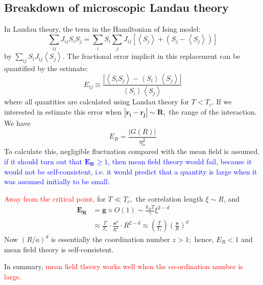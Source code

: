 \documentclass[12pt,titlepage]{article}
\newcommand{\redp}[1]{\textcolor{red}{#1}}
\newcommand{\bluep}[1]{\textcolor{blue}{#1}}
\numberwithin{equation}{section}
\begin{document}
\subsection{Breakdown of microscopic Landau theory}
In Landau theory, the term in the Hamiltonian of Ising model:
\begin{equation}
\sum_{i j} J_{i j} S_{i} S_{j}=\sum_{i} S_{i} \sum_{j} J_{i j}\left[\left\langle S_{j}\right\rangle+\left(S_{j}-\left\langle S_{j}\right\rangle\right)\right]
\end{equation}
by $\sum_{i j} S_{i} J_{i j}\left\langle S_{j}\right\rangle$. The fractional error implicit in this replacement can be quantified by the estimate:
\begin{equation}
E_{i j} \equiv \frac{\left|\left\langle S_{i} S_{j}\right\rangle-\left\langle S_{i}\right\rangle\left\langle S_{j}\right\rangle\right|}{\left\langle S_{i}\right\rangle\left\langle S_{j}\right\rangle}
\end{equation}
where all quantities are calculated using Landau theory for $T<T_{c}$. If we interested in estimate this error when $\left|\mathbf{r}_{\mathbf{i}}-\mathbf{r}_{\mathbf{j}}\right| \sim \boldsymbol{R},$ the range of the interaction. We have 
\begin{equation}
E_{R}=\frac{|G(R)|}{\eta_{s}^{2}}
\end{equation}
To calculate this, negligible fluctuation compared with the mean field is assumed. \bluep{if it should turn out that $\boldsymbol{E}_{\boldsymbol{R}} \geq 1$, then mean field theory would fail, because it would not be self-consistent, i.e. it would predict that a quantity is large when it was assumed initially to be small.}

\redp{Away from the critical point,} for $T \ll T_{c},$ the correlation length $\xi \sim R$, and 
\begin{equation}
\begin{aligned} \boldsymbol{E}_{\boldsymbol{R}} &=\boldsymbol{g} \times O(1) \sim \frac{k_{B} T}{\gamma} \xi^{2-d} \\ & \approx \frac{T}{T_{c}} \cdot \frac{\boldsymbol{a}^{d}}{R^{2}} \cdot R^{2-d} \approx\left(\frac{T}{T_{c}}\right)\left(\frac{\boldsymbol{a}}{R}\right)^{d} \end{aligned}
\end{equation}
Now $(R / a)^{d}$ is essentially the coordination number $z>1 ;$ hence, $E_{R}<1$
and mean field theory is self-consistent.

In summary, \redp{mean field theory works well when the co-ordination number is large.}
\end{document}
